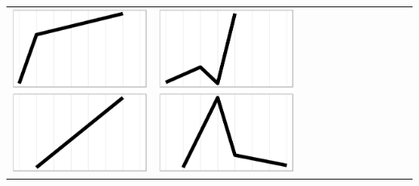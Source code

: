 \documentclass[conference]{IEEEtran}
\begin{document}
\begin{table}
\begin{tabular}{ | b{1.5cm} | c | c | c | c | c | c | c | c | c | c | c |}
 \includegraphics[scale=0.08]{figures/bbac.ps} &
 \includegraphics[scale=0.08]{figures/abca.ps} &  

\end{tabular}
\end{table}
\end{document}

